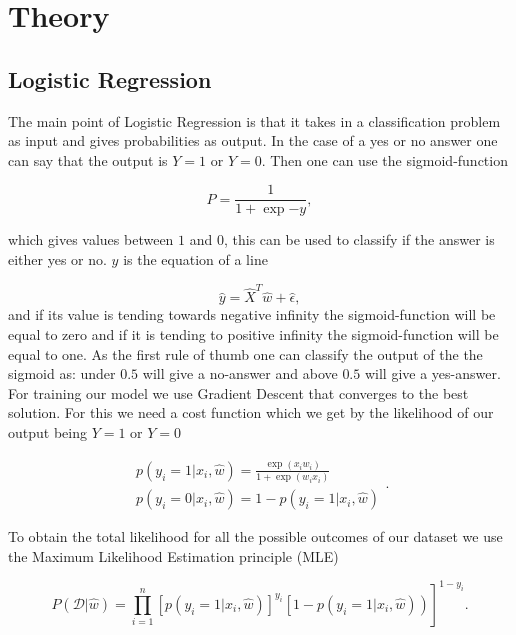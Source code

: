 \section{Theory}\label{sec:Theory}

\subsection{Logistic Regression}\label{subsec:LogRegTheory}
The main point of Logistic Regression is that it takes in a classification problem as input and gives probabilities as output. In the case of a yes or no answer one can say that the output is $Y = 1$ or $Y= 0$. Then one can use the sigmoid-function

\begin{equation}\label{eq:1}
    P = \frac{1}{1+\exp{-y}},
\end{equation}


which gives values between $1$ and $0$, this can be used to classify if the answer is either yes or no. $y$ is the equation of a line

\begin{equation}\label{eq:2}
    \hat{y}=\hat{X}^{T} \hat{w}+\hat{\epsilon},
\end{equation}
and if its value is tending towards negative infinity the sigmoid-function will be equal to zero and if it is tending to positive infinity the sigmoid-function will be equal to one. As the first rule of thumb one can classify the output of the the sigmoid as: under $0.5$ will give a no-answer and above $0.5$ will give a yes-answer. For training our model we use Gradient Descent that converges to the best solution. For this we need a cost function which we get by the likelihood of our output being $Y =1$ or $Y=0$

\begin{equation}\label{eq:3}
    \begin{array}{l}{p\left(y_{i}=1 | x_{i}, \hat{w}\right)=\frac{\exp \left(x_{i}w_{i}\right)}{1+\exp \left(w_{i} x_{i}\right)}} \\ {p\left(y_{i}=0 | x_{i}, \hat{w}\right)=1-p\left(y_{i}=1 | x_{i}, \hat{w}\right)}\end{array}.
\end{equation}

To obtain the total likelihood for all the possible outcomes of our dataset we use the Maximum Likelihood Estimation principle (MLE) \cite{Morten1}

\begin{equation}\label{eq:6}
    \left.P(\mathcal{D} | \hat{w})=\prod_{i=1}^{n}\left[p\left(y_{i}=1 | x_{i}, \hat{w}\right)\right]^{y_{i}}\left[1-p\left(y_{i}=1 | x_{i}, \hat{w}\right)\right)\right]^{1-y_{i}}.
\end{equation}

